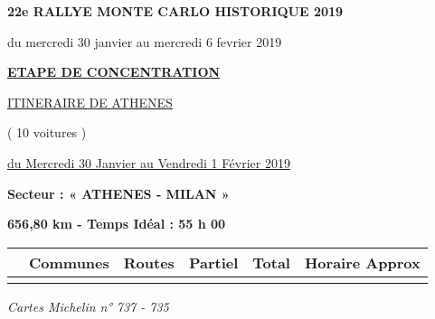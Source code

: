 \documentclass{article}%
\begin{document}
%
\normalsize%
\begin{center} \textbf{\LARGE{22e RALLYE MONTE CARLO HISTORIQUE 2019}} \end{center}%
\begin{flushleft} du mercredi 30 janvier au mercredi 6 fevrier 2019 \end{flushleft}%
\begin{center} \textbf{\underline{ETAPE DE CONCENTRATION}} \end{center}%
\begin{center} \underline{ITINERAIRE DE ATHENES					
} \end{center}%
\begin{center} ( 10 voitures ) \end{center}%
\begin{flushright} \underline{du  Mercredi 30 Janvier au Vendredi  1 Février 2019} \end{flushright}%
\begin{flushleft} \textbf{Secteur : « ATHENES - MILAN  »
} \end{flushleft}%
\begin{flushright} \textbf{656,80 km - Temps Idéal :   55 h 00 
} \end{flushright}%
\begin{longtable}{p{2.25cm}|p{7.0cm}|p{1.5cm}|p{1.5cm}|p{1.5cm}|p{3.5cm}}%
\hline%
&Communes&Routes&Partiel&Total&Horaire Approx\\%
\hline%
\endhead%
\endfoot%
\endlastfoot%
\hline%
\end{longtable}%
\begin{flushleft} \textit{Cartes Michelin n° 737 - 735} \end{flushleft}%
\end{document}
